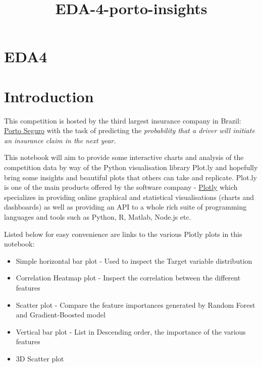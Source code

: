 \documentclass[11pt]{article}
\title{EDA-4-porto-insights}
\providecommand{\tightlist}{%
      \setlength{\itemsep}{0pt}\setlength{\parskip}{0pt}}
\begin{document}
    
    
    \maketitle
    
    

    
    \section{EDA4}\label{eda4}

    \section{Introduction}\label{introduction}

This competition is hosted by the third largest insurance company in
Brazil: \href{https://en.wikipedia.org/wiki/Porto_Seguro_S.A.}{Porto
Seguro} with the task of predicting the \emph{probability that a driver
will initiate an insurance claim in the next year.}

This notebook will aim to provide some interactive charts and analysis
of the competition data by way of the Python visualisation library
Plot.ly and hopefully bring some insights and beautiful plots that
others can take and replicate. Plot.ly is one of the main products
offered by the software company - \href{https://plot.ly/}{Plotly} which
specializes in providing online graphical and statistical visualisations
(charts and dashboards) as well as providing an API to a whole rich
suite of programming languages and tools such as Python, R, Matlab,
Node.js etc.

Listed below for easy convenience are links to the various Plotly plots
in this notebook:

\begin{itemize}
\tightlist
\item
  Simple horizontal bar plot - Used to inspect the Target variable
  distribution
\item
  Correlation Heatmap plot - Inspect the correlation between the
  different features
\item
  Scatter plot - Compare the feature importances generated by Random
  Forest and Gradient-Boosted model
\item
  Vertical bar plot - List in Descending order, the importance of the
  various features
\item
  3D Scatter plot
\end{itemize}
\end{document}
